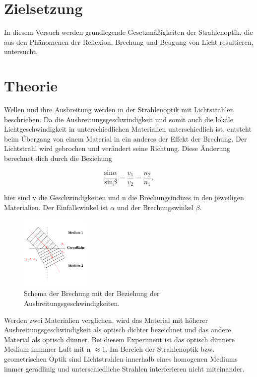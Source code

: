 \section{Zielsetzung}
\noindent In diesem Versuch werden grundlegende Gesetzmäßigkeiten der Strahlenoptik, die aus den Phänomenen der Reflexion, Brechung und Beugung von Licht resultieren, untersucht.
    

\section{Theorie}
\label{sec:Theorie}
Wellen und ihre Ausbreitung werden in der Strahlenoptik mit Lichtstrahlen beschrieben. Da die 
Ausbreitungsgeschwindigkeit und somit auch die lokale Lichtgeschwindigkeit in unterschiedlichen Materialien unterschiedlich ist, entsteht beim 
Übergang von einem Material in ein anderes der Effekt der Brechung. Der Lichtstrahl wird gebrochen und verändert seine Richtung. 
Diese Änderung berechnet dich durch die Beziehung

    \begin{equation}
        \frac{\text{sin}\alpha}{\text{sin} \beta} = \frac{v_1}{v_2} = \frac{n_2}{n_1},
    \end{equation}

    \noindent   hier sind v die Geschwindigkeiten und n die Brechungsindizes in den jeweiligen Materialien. Der Einfallswinkel ist $\alpha$ und der 
    Brechungswinkel $\beta$.

    \begin{figure}[H]
        \centering
        \includegraphics[width=0.3\textwidth]{images/pic1.PNG}
        \caption{Schema der Brechung mit der Beziehung der Ausbreitungsgeschwindigkeiten. \cite{400}}
     \label{fig:brech}
    \end{figure}

    \noindent Werden zwei Materialien verglichen, wird das Material mit höherer Ausbreitungsgeschwindigkeit als optisch dichter bezeichnet und das andere Material als optisch dünner. Bei diesem Experiment ist das optisch dünnere Medium immmer Luft mit n $\approx 1$. Im Bereich der Strahlenoptik bzw. geometrischen Optik sind Lichtstrahlen innerhalb eines homogenen Mediums immer geradlinig und unterschiedliche Strahlen interferieren nicht miteinander.

